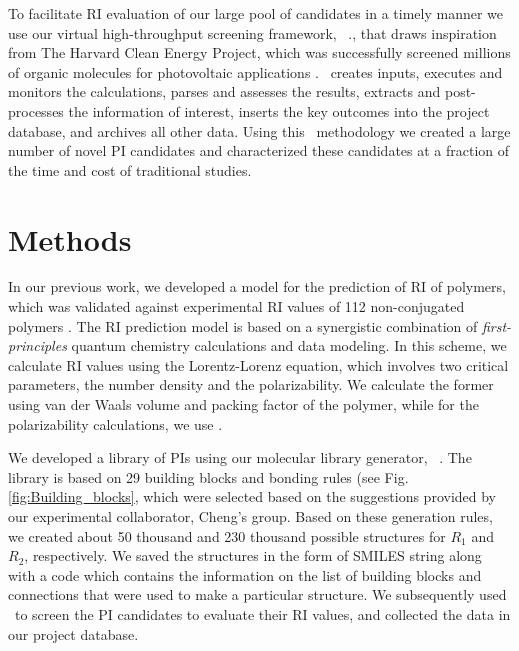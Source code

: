 To facilitate RI evaluation of our large pool of candidates in a timely manner we use our virtual high-throughput screening framework, \chemhtps\ \cite{Afzal2018c}., that draws inspiration from The Harvard Clean Energy Project, which was successfully screened millions of organic molecules for photovoltaic applications \citep{Hachmann2011,Hachmann2014,Olivares-Amaya2011}. \chemhtps\ creates inputs, executes and monitors the calculations, parses and assesses the results, extracts and post-processes the information of interest, inserts the key outcomes into the project database, and archives all other data. Using this \insilico\ methodology we created a large number of novel PI candidates and characterized these candidates at a fraction of the time and cost of traditional studies.

\section{Methods}
\label{sec:methods5}
In our previous work, we developed a model for the prediction of RI of polymers, which was validated against experimental RI values of 112 non-conjugated polymers \cite{Afzal2018a}.  The RI prediction model is based on a synergistic combination of \textit{first-principles} quantum chemistry calculations and data modeling. In this scheme, we calculate RI values using the Lorentz-Lorenz equation, which involves two critical parameters, the number density and the polarizability. We calculate the former using van der Waals volume and packing factor of the polymer, while for the polarizability calculations, we use \firstprinciples. 

We developed a library of PIs using our molecular library generator, \chemlg\ \cite{Afzal2018b}. The library is based on 29 building blocks and bonding rules (see Fig. \ref{fig:Building_blocks}, which were selected based on the suggestions provided by our experimental collaborator, Cheng's group. Based on these generation rules, we created about 50 thousand and 230 thousand possible structures for $R_1$ and $R_2$, respectively. We saved the structures in the form of SMILES string along with a code which contains the information on the list of building blocks and connections that were used to make a particular structure. We subsequently used \chemhtps\ to screen the PI candidates to evaluate their RI values, and collected the data in our project database. 

